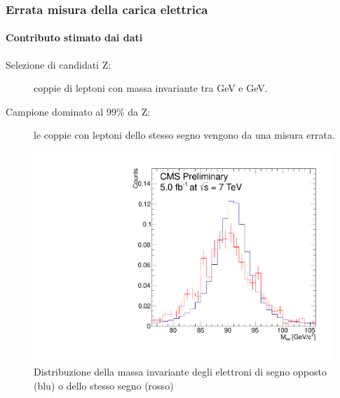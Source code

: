 \documentclass[italian]{beamer}
\begin{document}
\begin{frame}
    \frametitle{Errata misura della carica elettrica}
    \framesubtitle{Contributo stimato dai dati}
    \begin{description}
        \item[Selezione di candidati $\mathrm{Z}$:]
      coppie
    di leptoni con massa invariante tra \unit[76]{GeV} e
    \unit[106]{GeV}.
\item[Campione dominato al 99\% da $\mathrm{Z}$:] 
    le coppie con leptoni dello stesso segno vengono da una misura errata.
    \end{description}
    \begin{figure}[h]
        \centering
        \includegraphics[height=.5\textheight]{ChargeMisID_ZMass}
        \caption{Distribuzione della massa invariante degli elettroni di segno
        opposto (blu) o dello stesso segno (rosso)}
    \end{figure}
\end{frame}
\end{document}
